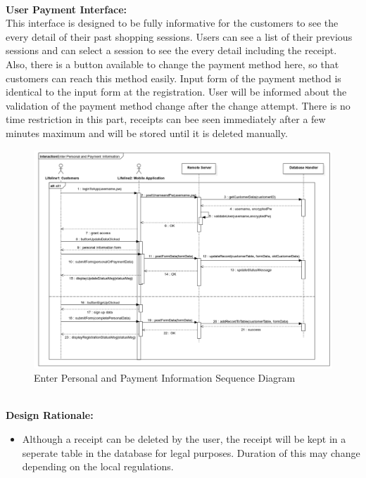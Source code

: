 \documentclass[11pt]{article}
\begin{document}
    \textbf{\\User Payment Interface:\\}
    This interface is designed to be fully informative for
    the customers to see the every detail of their past shopping sessions. Users can see a
    list of their previous sessions and can select a session to see the every detail including
    the receipt. Also, there is a button available to change the payment method here,
    so that customers can reach this method easily. Input form of the payment method
    is identical to the input form at the registration. User will be informed about the
    validation of the payment method change after the change attempt. There is no
    time restriction in this part, receipts can bee seen immediately after a few minutes
    maximum and will be stored until it is deleted manually.

    \begin{center}
        \begin{figure}[H]
            \includegraphics[width=\linewidth]{Images/EnterPersonalSeq.png}
            \caption{Enter Personal and Payment Information Sequence Diagram}  %
            \label{ppISD}
        \end{figure}
    \end{center}
    
    \textbf{\\Design Rationale:}
    \begin{itemize}
       \item Although a receipt can be deleted by the user, the receipt will be kept in a seperate table in the database for legal purposes.
       Duration of this may change depending on the local regulations.
    \end{itemize}
\end{document}
